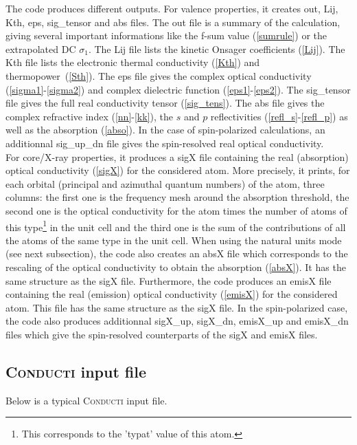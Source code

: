 \documentclass[a4,12pts]{extarticle}
\begin{document}
The code produces different outputs. For valence properties, it creates out, Lij, Kth, eps, sig\_tensor and abs files. The out file is a summary of the calculation, giving several important informations like the f-sum value (\ref{sumrule}) or the extrapolated DC $\sigma_1$. The Lij file lists the kinetic Onsager coefficients (\ref{Lij}). The Kth file lists the electronic thermal conductivity (\ref{Kth}) and thermopower~(\ref{Sth}).
The eps file gives the complex optical conductivity (\ref{sigma1}-\ref{sigma2}) and complex dielectric function (\ref{eps1}-\ref{eps2}). The sig\_tensor file gives the full real conductivity tensor (\ref{sig_tens}). The abs file gives the complex refractive index (\ref{nn}-\ref{kk}), the $s$ and $p$ reflectivities (\ref{refl_s}-\ref{refl_p}) as well as the absorption (\ref{abso}). In the case of spin-polarized calculations, an additionnal sig\_up\_dn file gives the spin-resolved real optical conductivity.\\

For core/X-ray properties, it produces a sigX file containing the real (absorption) optical conductivity (\ref{sigX}) for the considered atom. More precisely, it prints, for each orbital (principal and azimuthal quantum numbers) of the atom, three columns: the first one is the frequency mesh around the absorption threshold, the second one is the optical conductivity for the atom times the number of atoms of this type\footnote{This corresponds to the 'typat' value of this atom.} in the unit cell and the third one is the sum of the contributions of all the atoms of the same type in the unit cell. When using the natural units mode (see next subsection), the code also creates an absX file which corresponds to the rescaling of the optical conductivity to obtain the absorption (\ref{absX}). It has the same structure as the sigX file. 
Furthermore, the code produces an emisX file containing the real (emission) optical conductivity (\ref{emisX}) for the considered atom. This file has the same structure as the sigX file.
In the spin-polarized case, the code also produces additionnal sigX\_up, sigX\_dn, emisX\_up and emisX\_dn files which give the spin-resolved counterparts of the sigX and emisX files.

\subsection{\textsc{Conducti} input file}

Below is a typical \textsc{Conducti} input file.
\end{document}
